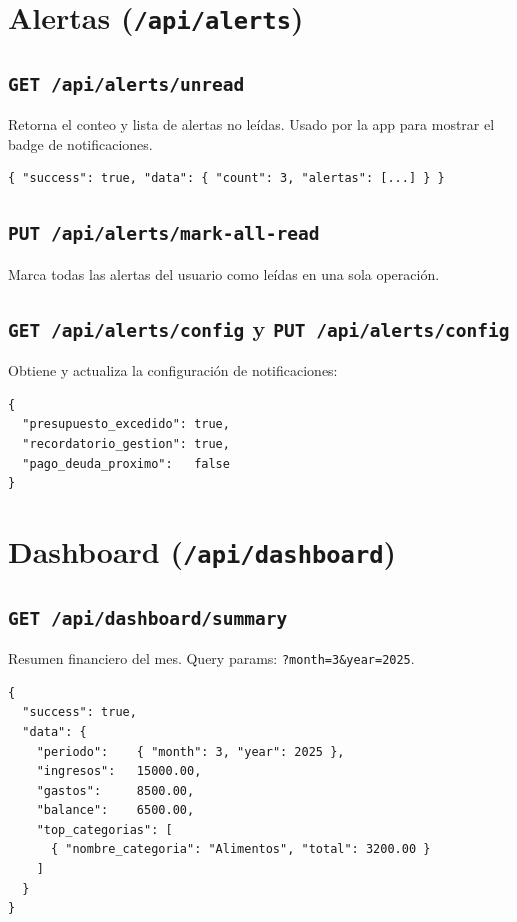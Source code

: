 \section{Alertas (\texttt{/api/alerts})}

\subsection{\texttt{GET /api/alerts/unread}}
Retorna el conteo y lista de alertas no leídas. Usado por la app para mostrar el badge de notificaciones.
\begin{lstlisting}[style=json]
{ "success": true, "data": { "count": 3, "alertas": [...] } }
\end{lstlisting}

\subsection{\texttt{PUT /api/alerts/mark-all-read}}
Marca todas las alertas del usuario como leídas en una sola operación.

\subsection{\texttt{GET /api/alerts/config} y \texttt{PUT /api/alerts/config}}
Obtiene y actualiza la configuración de notificaciones:
\begin{lstlisting}[style=json]
{
  "presupuesto_excedido": true,
  "recordatorio_gestion": true,
  "pago_deuda_proximo":   false
}
\end{lstlisting}

\section{Dashboard (\texttt{/api/dashboard})}

\subsection{\texttt{GET /api/dashboard/summary}}
Resumen financiero del mes. Query params: \texttt{?month=3\&year=2025}.
\begin{lstlisting}[style=json]
{
  "success": true,
  "data": {
    "periodo":    { "month": 3, "year": 2025 },
    "ingresos":   15000.00,
    "gastos":     8500.00,
    "balance":    6500.00,
    "top_categorias": [
      { "nombre_categoria": "Alimentos", "total": 3200.00 }
    ]
  }
}
\end{lstlisting}

